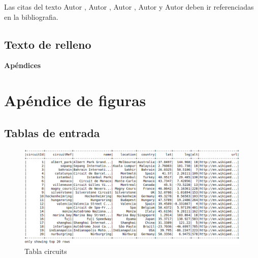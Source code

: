 \documentclass[12pt,twoside,titlepage]{report}
\newcommand\blankpage{%
    \newpage
    \null
    \thispagestyle{empty}%
    \newpage}
\begin{document}
Las citas del texto Autor \cite{giaquinta}, Autor \cite{fortune}, Autor \cite{fortuneB}, Autor \cite{mitchell} y Autor \cite{morrey} deben ir referenciadas en la bibliografia.


\section{Texto de relleno}

\lipsum[1-18]
\blankpage










{}

\footnotesize{
%


}



\raggedbottom
\afterpage{\blankpage}

\newpage





\appendix

{}

\mbox{}
\vfill
\begin{center}
\begin{Huge}
\textbf{Apéndices}
\end{Huge}
\end{center}
\vfill
\mbox{}
\thispagestyle{empty}

\newpage
\mbox{}
\thispagestyle{empty}
\newpage


\chapter{Apéndice de figuras}
\label{sec:apendice}

\section{Tablas de entrada}

\begin{figure}
  \includegraphics[scale=0.4]{circuits_table.png}
  \centering
  \caption{Tabla circuits}
  \label{fig:circuits}
  \centering
\end{figure}
\end{document}
